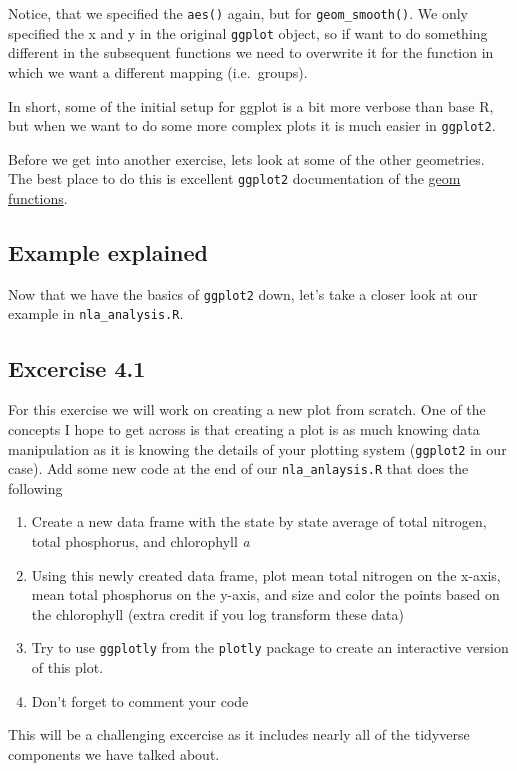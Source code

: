 \documentclass[]{article}
\providecommand{\tightlist}{%
  \setlength{\itemsep}{0pt}\setlength{\parskip}{0pt}}
\begin{document}
Notice, that we specified the \texttt{aes()} again, but for
\texttt{geom\_smooth()}. We only specified the x and y in the original
\texttt{ggplot} object, so if want to do something different in the
subsequent functions we need to overwrite it for the function in which
we want a different mapping (i.e.~groups).

In short, some of the initial setup for ggplot is a bit more verbose
than base R, but when we want to do some more complex plots it is much
easier in \texttt{ggplot2}.

Before we get into another exercise, lets look at some of the other
geometries. The best place to do this is excellent \texttt{ggplot2}
documentation of the \href{http://docs.ggplot2.org/current/}{geom
functions}.

\hypertarget{example-explained}{%
\subsection{Example explained}\label{example-explained}}

Now that we have the basics of \texttt{ggplot2} down, let's take a
closer look at our example in \texttt{nla\_analysis.R}.

\hypertarget{excercise-4.1}{%
\subsection{Excercise 4.1}\label{excercise-4.1}}

For this exercise we will work on creating a new plot from scratch. One
of the concepts I hope to get across is that creating a plot is as much
knowing data manipulation as it is knowing the details of your plotting
system (\texttt{ggplot2} in our case). Add some new code at the end of
our \texttt{nla\_anlaysis.R} that does the following

\begin{enumerate}
\def\labelenumi{\arabic{enumi}.}
\tightlist
\item
  Create a new data frame with the state by state average of total
  nitrogen, total phosphorus, and chlorophyll \emph{a}
\item
  Using this newly created data frame, plot mean total nitrogen on the
  x-axis, mean total phosphorus on the y-axis, and size and color the
  points based on the chlorophyll (extra credit if you log transform
  these data)
\item
  Try to use \texttt{ggplotly} from the \texttt{plotly} package to
  create an interactive version of this plot.
\item
  Don't forget to comment your code
\end{enumerate}

This will be a challenging excercise as it includes nearly all of the
tidyverse components we have talked about.
\end{document}
